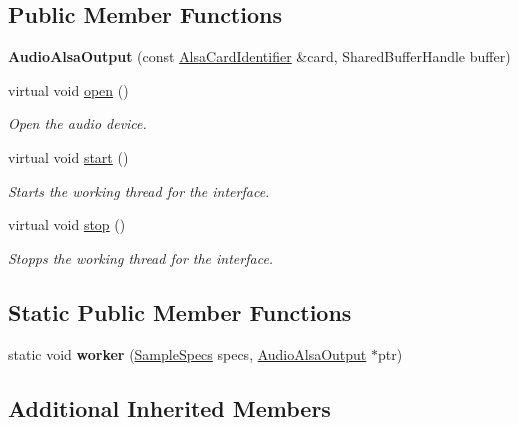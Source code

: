 \subsection*{Public Member Functions}
\begin{DoxyCompactItemize}
\item 
\hypertarget{classNl_1_1AudioAlsaOutput_a27bd852a0c3459500ad2b28317fe3e9d}{{\bfseries Audio\-Alsa\-Output} (const \hyperlink{classNl_1_1AlsaCardIdentifier}{Alsa\-Card\-Identifier} \&card, Shared\-Buffer\-Handle buffer)}\label{classNl_1_1AudioAlsaOutput_a27bd852a0c3459500ad2b28317fe3e9d}

\item 
virtual void \hyperlink{classNl_1_1AudioAlsaOutput_a94792430810853353314a71f1b54a5d3}{open} ()
\begin{DoxyCompactList}\small\item\em Open the audio device. \end{DoxyCompactList}\item 
virtual void \hyperlink{classNl_1_1AudioAlsaOutput_a9d2239af344a6773942add0dc38514d3}{start} ()
\begin{DoxyCompactList}\small\item\em Starts the working thread for the interface. \end{DoxyCompactList}\item 
virtual void \hyperlink{classNl_1_1AudioAlsaOutput_acd8cb8bfe0722c1c20d8da0f3963683e}{stop} ()
\begin{DoxyCompactList}\small\item\em Stopps the working thread for the interface. \end{DoxyCompactList}\end{DoxyCompactItemize}
\subsection*{Static Public Member Functions}
\begin{DoxyCompactItemize}
\item 
\hypertarget{classNl_1_1AudioAlsaOutput_acae749e941cb4a053494e7233e90cfdc}{static void {\bfseries worker} (\hyperlink{structNl_1_1SampleSpecs}{Sample\-Specs} specs, \hyperlink{classNl_1_1AudioAlsaOutput}{Audio\-Alsa\-Output} $\ast$ptr)}\label{classNl_1_1AudioAlsaOutput_acae749e941cb4a053494e7233e90cfdc}

\end{DoxyCompactItemize}
\subsection*{Additional Inherited Members}


